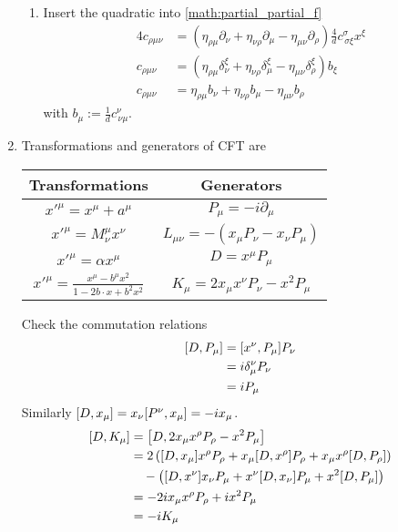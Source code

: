 \begin{enumerate}
\begin{enumerate}
			\item Insert the quadratic into \eqref{math:partial_partial_f}
				\begin{align*}
					4c_{\rho \mu\nu}	&= ( \eta_{\rho\mu} \partial_\nu +  \eta_{\nu\rho} \partial_\mu -\eta_{\mu\nu} \partial_\rho  ) \frac{4}{d} c^\sigma_{\,\sigma\xi} x^\xi \\
					c_{\rho\mu\nu} &=  (\eta_{\rho\mu}\delta^\xi_\nu + \eta_{\nu\rho} \delta^\xi_\mu - \eta_{\mu\nu} \delta^\xi_\rho) b_\xi \\
					c_{\rho\mu\nu} &= \eta_{\rho\mu} b_\nu + \eta_{\nu\rho} b_\mu - \eta_{\mu\nu } b_\rho
				\end{align*}
				with $b_\mu := \frac{1}{d} c^\nu_{\,\nu\mu}$.
		\end{enumerate}
	\item 
		Transformations and generators of CFT are
		\begin{table}[ht]
			\centering
			\label{tab:label}
			\begin{tabular}{c | c}
				\toprule
				Transformations & Generators \\
				\midrule
				$x'^\mu = x^\mu + a^\mu$ & $P_\mu = -i \partial_\mu$ \\
				$x'^\mu = M^\mu_\nu x^\nu$ & $L_{\mu\nu}  = - (x_\mu P_\nu - x_\nu P_\mu)$ \\
				$x'^\mu = \alpha x^\mu$ & $D = x^\mu P_\mu$ \\
				$x'^\mu = \frac{x^\mu - b^\mu x^2}{1-2b\cdot x + b^2 x^2}$ & $K_\mu  = 2x_\mu x^\nu P_\nu - x^2 P_\mu$ \\
				\bottomrule
			\end{tabular}
		\end{table}
		Check the commutation relations
		\begin{align}
			\comm{D}{P_\mu} &= \comm{x^\nu}{P_\mu} P_\nu \notag \\
								 &= i \delta^\nu_\mu P_\nu \notag \\
								 &= i P_\mu
		\end{align}
		Similarly $\comm{D}{x_\mu} = x_\nu \comm{P^\nu}{x_\mu} = -ix_\mu$.
		\begin{align}
			\comm{D}{K_\mu} &= \comm{D}{2 x_\mu x^\rho P_\rho - x^2 P_\mu} \notag \\
								 &= 2 \left(\comm{D}{x_\mu}x^\rho P_\rho + x_\mu \comm{D}{x^\rho} P_\rho + x_\mu x^\rho \comm{D}{P_\rho} \right) \notag \\
								 &\quad - \left( \comm{D}{x^\nu}x_\nu P_\mu + x^\nu \comm{D}{x_\nu} P_\mu + x^2 \comm{D}{P_\mu} \right) \notag \\
								 &= -2i x_\mu x^\rho P_\rho +  i x^2 P_\mu \notag \\
								 &= -i K_\mu
		\end{align}


\end{enumerate}

